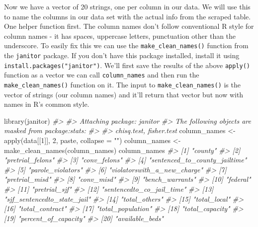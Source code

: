 \documentclass[
]{krantz}
\makeatletter
\newenvironment{Shaded}{\begin{snugshade}}{\end{snugshade}}
\newcommand{\AttributeTok}[1]{\textcolor[rgb]{0.61,0.61,0.61}{#1}}
\newcommand{\CommentTok}[1]{\textcolor[rgb]{0.37,0.37,0.37}{\textit{#1}}}
\newcommand{\DecValTok}[1]{\textcolor[rgb]{0.06,0.06,0.06}{#1}}
\newcommand{\FunctionTok}[1]{\textcolor[rgb]{0,0,0}{#1}}
\newcommand{\NormalTok}[1]{#1}
\newcommand{\OtherTok}[1]{\textcolor[rgb]{0.37,0.37,0.37}{#1}}
\newcommand{\StringTok}[1]{\textcolor[rgb]{0.5,0.5,0.5}{#1}}
\newenvironment{kframe}{%
\medskip{}
\setlength{\fboxsep}{.8em}
 \def\at@end@of@kframe{}%
 \ifinner\ifhmode%
  \def\at@end@of@kframe{\end{minipage}}%
  \begin{minipage}{\columnwidth}%
 \fi\fi%
 \def\FrameCommand##1{\hskip\@totalleftmargin \hskip-\fboxsep
 \colorbox{shadecolor}{##1}\hskip-\fboxsep
     \hskip-\linewidth \hskip-\@totalleftmargin \hskip\columnwidth}%
 \MakeFramed {\advance\hsize-\width
   \@totalleftmargin\z@ \linewidth\hsize
   \@setminipage}}%
 {\par\unskip\endMakeFramed%
 \at@end@of@kframe}
\renewenvironment{Shaded}{\begin{kframe}}{\end{kframe}}
\makeatother
\begin{document}
Now we have a vector of 20 strings, one per column in our data. We will use this to name the columns in our data set with the actual info from the scraped table. One helper function first. The column names don't follow conventional R style for column names - it has spaces, uppercase letters, punctuation other than the underscore. To easily fix this we can use the \texttt{make\_clean\_names()} function from the \texttt{janitor} package. If you don't have this package installed, install it using \texttt{install.packages("janitor")}. We'll first save the results of the above \texttt{apply()} function as a vector we can call \texttt{column\_names} and then run the \texttt{make\_clean\_names()} function on it. The input to \texttt{make\_clean\_names()} is the vector of strings (our column names) and it'll return that vector but now with names in R's common style.

\begin{Shaded}
\begin{Highlighting}[]
\FunctionTok{library}\NormalTok{(janitor)}
\CommentTok{\#\textgreater{} }
\CommentTok{\#\textgreater{} Attaching package: \textquotesingle{}janitor\textquotesingle{}}
\CommentTok{\#\textgreater{} The following objects are masked from \textquotesingle{}package:stats\textquotesingle{}:}
\CommentTok{\#\textgreater{} }
\CommentTok{\#\textgreater{}     chisq.test, fisher.test}
\NormalTok{column\_names }\OtherTok{\textless{}{-}} \FunctionTok{apply}\NormalTok{(data[[}\DecValTok{1}\NormalTok{]], }\DecValTok{2}\NormalTok{, paste, }\AttributeTok{collapse =} \StringTok{""}\NormalTok{)}
\NormalTok{column\_names }\OtherTok{\textless{}{-}} \FunctionTok{make\_clean\_names}\NormalTok{(column\_names)}
\NormalTok{column\_names}
\CommentTok{\#\textgreater{}  [1] "county"                      }
\CommentTok{\#\textgreater{}  [2] "pretrial\_felons"             }
\CommentTok{\#\textgreater{}  [3] "conv\_felons"                 }
\CommentTok{\#\textgreater{}  [4] "sentenced\_to\_county\_jailtime"}
\CommentTok{\#\textgreater{}  [5] "parole\_violators"            }
\CommentTok{\#\textgreater{}  [6] "violatorswith\_a\_new\_charge"  }
\CommentTok{\#\textgreater{}  [7] "pretrial\_misd"               }
\CommentTok{\#\textgreater{}  [8] "conv\_misd"                   }
\CommentTok{\#\textgreater{}  [9] "bench\_warrants"              }
\CommentTok{\#\textgreater{} [10] "federal"                     }
\CommentTok{\#\textgreater{} [11] "pretrial\_sjf"                }
\CommentTok{\#\textgreater{} [12] "sentencedto\_co\_jail\_time"    }
\CommentTok{\#\textgreater{} [13] "sjf\_sentencedto\_state\_jail"  }
\CommentTok{\#\textgreater{} [14] "total\_others"                }
\CommentTok{\#\textgreater{} [15] "total\_local"                 }
\CommentTok{\#\textgreater{} [16] "total\_contract"              }
\CommentTok{\#\textgreater{} [17] "total\_population"            }
\CommentTok{\#\textgreater{} [18] "total\_capacity"              }
\CommentTok{\#\textgreater{} [19] "percent\_of\_capacity"         }
\CommentTok{\#\textgreater{} [20] "available\_beds"}
\end{Highlighting}
\end{Shaded}
\end{document}
